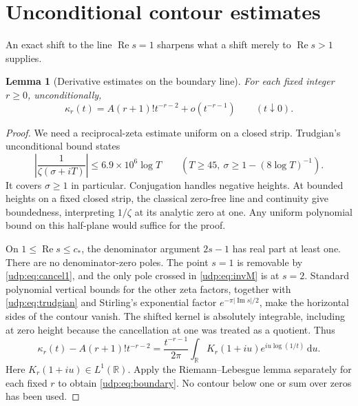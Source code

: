 \documentclass[11pt]{article}
\newtheorem{lemma}[theorem]{Lemma}
\theoremstyle{remark}\newtheorem{remark}[theorem]{Remark}
\DeclareMathOperator{\Rea}{Re}
\DeclareMathOperator{\Ima}{Im}
\newcommand{\dd}{\,\mathrm d}
\newcommand{\R}{\mathbb R}
\numberwithin{equation}{section}
\begin{document}
\section{Unconditional contour estimates}\label{udp:sec:unconditional}
An exact shift to the line $\Rea s=1$ sharpens what a shift merely to $\Rea s>1$ supplies.

\begin{lemma}[Derivative estimates on the boundary line]\label{udp:lem:boundary}
For each fixed integer $r\ge0$, unconditionally,
\begin{equation}\label{udp:eq:boundary}
 \kappa_r(t)=A(r+1)!t^{-r-2}+o(t^{-r-1})
 \qquad(t\downarrow0).
\end{equation}
\end{lemma}
\begin{proof}
We need a reciprocal-zeta estimate uniform on a closed strip. Trudgian's unconditional bound \cite{trudgian} states
\begin{equation}\label{udp:eq:trudgian}
 \left|\frac1{\zeta(\sigma+iT)}\right|
 \le6.9\times10^6\log T\qquad
 (T\ge45,\ \sigma\ge1-(8\log T)^{-1}).
\end{equation}
It covers $\sigma\ge1$ in particular. Conjugation handles negative heights. At bounded heights on a fixed closed strip, the classical zero-free line and continuity give boundedness, interpreting $1/\zeta$ at its analytic zero at one. Any uniform polynomial bound on this half-plane would suffice for the proof.

On $1\le\Rea s\le c_*$, the denominator argument $2s-1$ has real part at least one. There are no denominator-zero poles. The point $s=1$ is removable by \eqref{udp:eq:cancel1}, and the only pole crossed in \eqref{udp:eq:invM} is at $s=2$. Standard polynomial vertical bounds for the other zeta factors, together with \eqref{udp:eq:trudgian} and Stirling's exponential factor $e^{-\pi|\Ima s|/2}$, make the horizontal sides of the contour vanish. The shifted kernel is absolutely integrable, including at zero height because the cancellation at one was treated as a quotient. Thus
\begin{equation}\label{udp:eq:RL}
 \kappa_r(t)-A(r+1)!t^{-r-2}
 =\frac{t^{-r-1}}{2\pi}
 \int_{\R}K_r(1+iu)e^{iu\log(1/t)}\dd u.
\end{equation}
Here $K_r(1+iu)\in L^1(\R)$. Apply the Riemann--Lebesgue lemma separately for each fixed $r$ to obtain \eqref{udp:eq:boundary}. No contour below one or sum over zeros has been used.
\end{proof}
\end{document}
